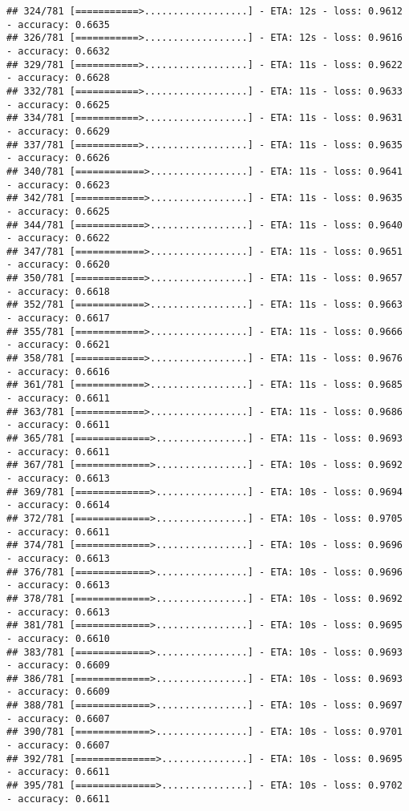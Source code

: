 \documentclass[
]{article}
\begin{document}
\begin{verbatim}
## 324/781 [===========>..................] - ETA: 12s - loss: 0.9612 - accuracy: 0.6635
## 326/781 [===========>..................] - ETA: 12s - loss: 0.9616 - accuracy: 0.6632
## 329/781 [===========>..................] - ETA: 11s - loss: 0.9622 - accuracy: 0.6628
## 332/781 [===========>..................] - ETA: 11s - loss: 0.9633 - accuracy: 0.6625
## 334/781 [===========>..................] - ETA: 11s - loss: 0.9631 - accuracy: 0.6629
## 337/781 [===========>..................] - ETA: 11s - loss: 0.9635 - accuracy: 0.6626
## 340/781 [============>.................] - ETA: 11s - loss: 0.9641 - accuracy: 0.6623
## 342/781 [============>.................] - ETA: 11s - loss: 0.9635 - accuracy: 0.6625
## 344/781 [============>.................] - ETA: 11s - loss: 0.9640 - accuracy: 0.6622
## 347/781 [============>.................] - ETA: 11s - loss: 0.9651 - accuracy: 0.6620
## 350/781 [============>.................] - ETA: 11s - loss: 0.9657 - accuracy: 0.6618
## 352/781 [============>.................] - ETA: 11s - loss: 0.9663 - accuracy: 0.6617
## 355/781 [============>.................] - ETA: 11s - loss: 0.9666 - accuracy: 0.6621
## 358/781 [============>.................] - ETA: 11s - loss: 0.9676 - accuracy: 0.6616
## 361/781 [============>.................] - ETA: 11s - loss: 0.9685 - accuracy: 0.6611
## 363/781 [============>.................] - ETA: 11s - loss: 0.9686 - accuracy: 0.6611
## 365/781 [=============>................] - ETA: 11s - loss: 0.9693 - accuracy: 0.6611
## 367/781 [=============>................] - ETA: 10s - loss: 0.9692 - accuracy: 0.6613
## 369/781 [=============>................] - ETA: 10s - loss: 0.9694 - accuracy: 0.6614
## 372/781 [=============>................] - ETA: 10s - loss: 0.9705 - accuracy: 0.6611
## 374/781 [=============>................] - ETA: 10s - loss: 0.9696 - accuracy: 0.6613
## 376/781 [=============>................] - ETA: 10s - loss: 0.9696 - accuracy: 0.6613
## 378/781 [=============>................] - ETA: 10s - loss: 0.9692 - accuracy: 0.6613
## 381/781 [=============>................] - ETA: 10s - loss: 0.9695 - accuracy: 0.6610
## 383/781 [=============>................] - ETA: 10s - loss: 0.9693 - accuracy: 0.6609
## 386/781 [=============>................] - ETA: 10s - loss: 0.9693 - accuracy: 0.6609
## 388/781 [=============>................] - ETA: 10s - loss: 0.9697 - accuracy: 0.6607
## 390/781 [=============>................] - ETA: 10s - loss: 0.9701 - accuracy: 0.6607
## 392/781 [==============>...............] - ETA: 10s - loss: 0.9695 - accuracy: 0.6611
## 395/781 [==============>...............] - ETA: 10s - loss: 0.9702 - accuracy: 0.6611

\end{verbatim}
\end{document}
